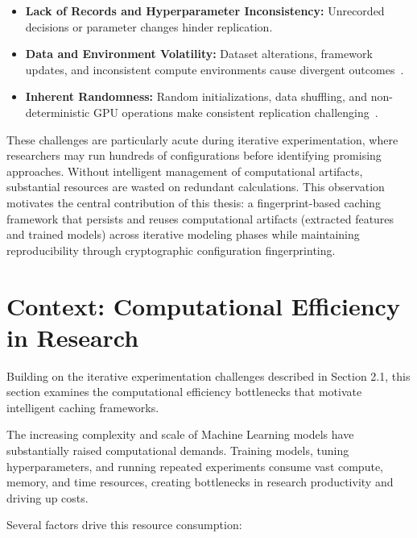 \documentclass{imc-inf} %
\begin{document}
\begin{itemize}
    \item \textbf{Lack of Records and Hyperparameter Inconsistency:} 
          Unrecorded decisions or parameter changes hinder replication.
    \item \textbf{Data and Environment Volatility:} Dataset alterations, 
          framework updates, and inconsistent compute environments cause 
          divergent outcomes~\cite{idowu2024empirical}.
    \item \textbf{Inherent Randomness:} Random initializations, data 
          shuffling, and non-deterministic GPU operations make consistent 
          replication challenging~\cite{semmelrock2023reproducibility}.
\end{itemize}

These challenges are particularly acute during iterative experimentation, 
where researchers may run hundreds of configurations before identifying 
promising approaches. Without intelligent management of computational 
artifacts, substantial resources are wasted on redundant calculations. 
This observation motivates the central contribution of this thesis: a 
fingerprint-based caching framework that persists and reuses computational 
artifacts (extracted features and trained models) across iterative modeling 
phases while maintaining reproducibility through cryptographic configuration 
fingerprinting.

\section{Context: Computational Efficiency in Research}

Building on the iterative experimentation challenges described in 
Section 2.1, this section examines the computational efficiency bottlenecks 
that motivate intelligent caching frameworks.

The increasing complexity and scale of Machine Learning models have 
substantially raised computational demands. Training models, tuning 
hyperparameters, and running repeated experiments consume vast compute, 
memory, and time resources, creating bottlenecks in research productivity 
and driving up costs.

Several factors drive this resource consumption:
\end{document}
